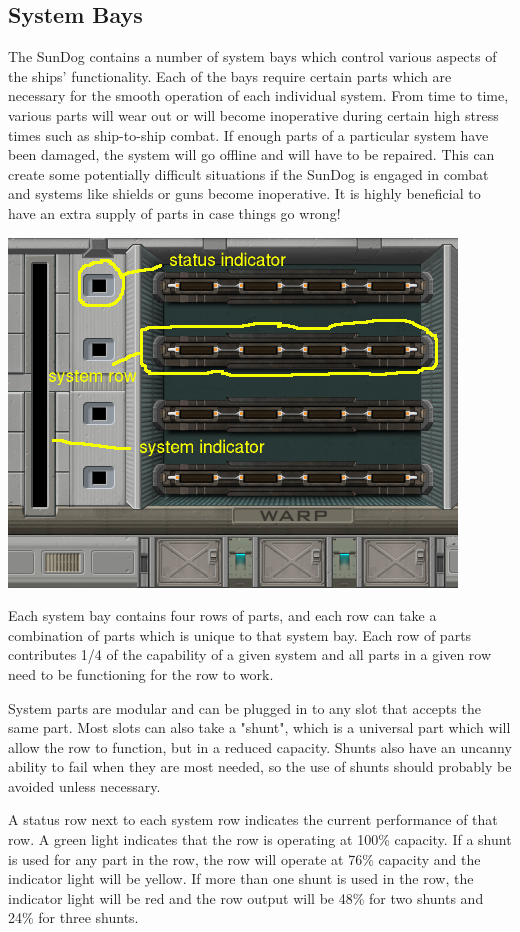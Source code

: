 \begin{itemize}
\subsection{System Bays}
The SunDog contains a number of system bays which control various aspects of
the ships' functionality.  Each of the bays require certain parts which are
necessary for the smooth operation of each individual system.  From time to
time, various parts will wear out or will become inoperative during certain
high stress times such as ship-to-ship combat.  If enough parts of a particular
system have been damaged, the system will go offline and will have to be
repaired.  This can create some potentially difficult situations if the
SunDog is engaged in combat and systems like shields or guns become
inoperative.  It is highly beneficial to have an extra supply of parts in
case things go wrong!

\includegraphics[scale=0.70]{images/interior-warp.png}

Each system bay contains four rows of parts, and each row can take a
combination of parts which is unique to that system bay.  Each row of
parts contributes 1/4 of the capability of a given system and all parts
in a given row need to be functioning for the row to work.

System parts are modular and can be plugged in to any slot that accepts the
same part.  Most slots can also take a "shunt", which is a universal part
which will allow the row to function, but in a reduced capacity.  Shunts
also have an uncanny ability to fail when they are most needed, so the use
of shunts should probably be avoided unless necessary.

A status row next to each system row indicates the current performance
of that row.  A green light indicates that the row is operating at
100\% capacity.  If a shunt is used for any part in the row, the row will
operate at 76\% capacity and the indicator light will be yellow.  If
more than one shunt is used in the row, the indicator light will be red
and the row output will be 48\% for two shunts and 24\% for three shunts.


\end{itemize}

